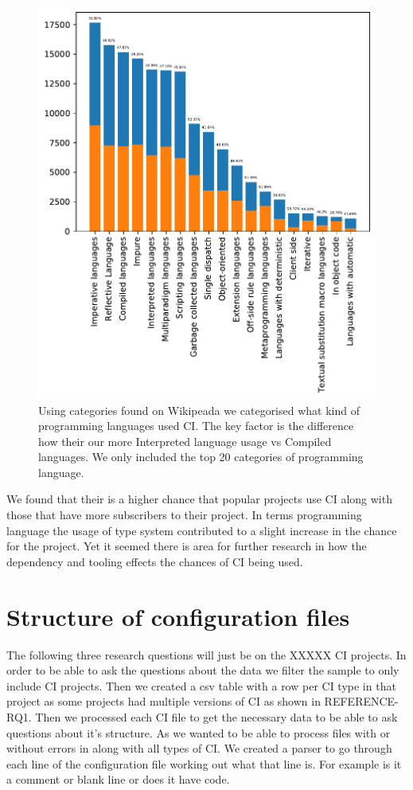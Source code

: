 \documentclass[twoside,12pt,titlepage,a4paper]{article}
\begin{document}
\begin{figure}[!h]
  \centering
  \includegraphics[width=.8\textwidth]{../src/results/languages.pdf}
  \caption{Using categories found on Wikipeada \citet{2020Wiki} we categorised what kind of programming languages used CI. The key factor is the difference how their our more Interpreted language usage vs Compiled languages. We only included the top 20 categories of programming language.}
  \label{graph:langs}
\end{figure}

We found that their is a higher chance that popular projects use CI along with those that have more subscribers to their project. In terms programming language the usage of type system contributed to a slight increase in the chance for the project. Yet it seemed there is area for further research in how the dependency and tooling effects the chances of CI being used. 
 
\pagebreak
\section{Structure of configuration files}

The following three research questions will just be on the XXXXX CI projects. In order to be able to ask the questions about the data we filter the sample to only include CI projects. Then we created a csv table with a row per CI type in that project as some projects had multiple versions of CI as shown in REFERENCE-RQ1. Then we processed each CI file to get the necessary data to be able to ask questions about it's structure. As we wanted to be able to process files with or without errors in along with all types of CI. We created a parser to go through each line of the configuration file working out what that line is. For example is it a comment or blank line or does it have code. 
\end{document}
